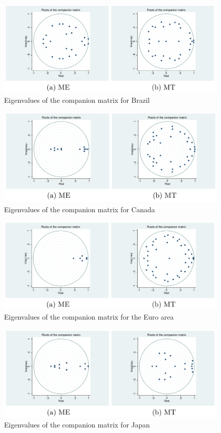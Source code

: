 \documentclass[a4paper, twoside]{templates/ociamthesis}
\begin{document}
\begin{figure}[!ht]

{\centering \includegraphics[width=0.66\linewidth]{figure/BRL} 

}

\caption{Eigenvalues of the companion matrix for Brazil}\label{fig:FigureE2}
\end{figure}

\begin{figure}[!ht]

{\centering \includegraphics[width=0.66\linewidth]{figure/CAD} 

}

\caption{Eigenvalues of the companion matrix for Canada}\label{fig:FigureE3}
\end{figure}

\clearpage

\begin{figure}[!ht]

{\centering \includegraphics[width=0.66\linewidth]{figure/EUR} 

}

\caption{Eigenvalues of the companion matrix for the Euro area}\label{fig:FigureE4}
\end{figure}

\begin{figure}[!ht]

{\centering \includegraphics[width=0.66\linewidth]{figure/JPY} 

}

\caption{Eigenvalues of the companion matrix for Japan}\label{fig:FigureE5}
\end{figure}
\end{document}
